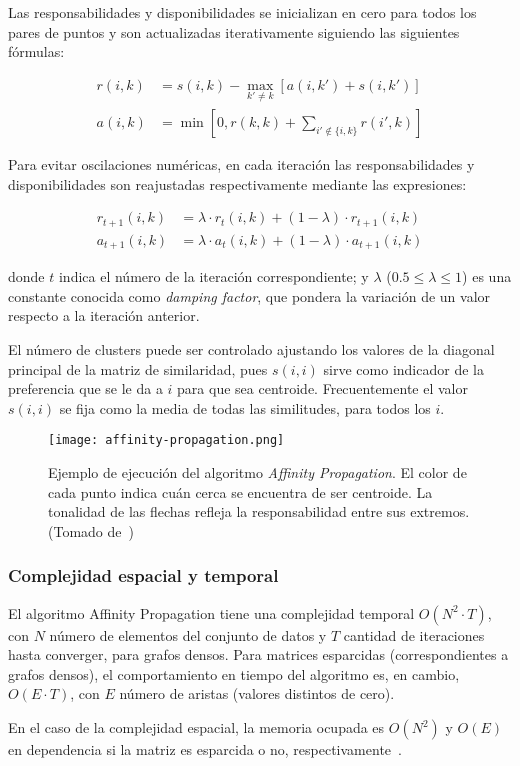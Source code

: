 Las responsabilidades y disponibilidades se inicializan en cero para todos los pares de puntos y son actualizadas iterativamente siguiendo las siguientes fórmulas:

\begin{align}
    \label{eq:responsibility}
    r(i,k) &= s(i,k) - \max_{k' \neq k}\left[ a(i, k') + s(i,k') \right] \\
    \label{eq:availability}
    a(i, k) &= \min\left[ 0, r(k,k) + \sum_{i'\notin \{i, k\}}{r(i', k)} \right]
\end{align}

Para evitar oscilaciones numéricas, en cada iteración las responsabilidades y disponibilidades son reajustadas respectivamente mediante las expresiones:

\begin{align}
    \label{eq:responsibility-damping}
    r_{t+1}(i,k) &= \lambda \cdot r_t (i,k) + (1-\lambda)\cdot r_{t+1}(i,k) \\
    \label{eq:availability-damping}
    a_{t+1}(i,k) &= \lambda \cdot a_t (i,k) + (1-\lambda)\cdot a_{t+1}(i,k)
\end{align}

\noindent
donde $t$ indica el número de la iteración correspondiente;
y $\lambda$ ($0.5 \leq \lambda \leq 1$) es una constante conocida como \textit{damping factor}, que pondera la variación de un valor respecto a la iteración anterior.

El número de clusters puede ser controlado ajustando los valores de la diagonal principal de la matriz de similaridad, pues $s(i,i)$ sirve como indicador de la preferencia que se le da a $i$ para que sea centroide.
Frecuentemente el valor $s(i,i)$ se fija como la media de todas las similitudes, para todos los $i$.

\begin{figure}[!h]
    \centering
    \texttt{[image: affinity-propagation.png]}
    \caption{Ejemplo de ejecución del algoritmo \textit{Affinity Propagation}. El color de cada punto indica cuán cerca se encuentra de ser centroide. La tonalidad de las flechas refleja la responsabilidad entre sus extremos. (Tomado de~\cite{Murphy12})}
    \label{img:affinity-propagation}
\end{figure}

\subsubsection{Complejidad espacial y temporal}

El algoritmo Affinity Propagation tiene una complejidad temporal $O(N^2 \cdot T)$, con $N$ número de elementos del conjunto de datos y $T$ cantidad de iteraciones hasta converger, para grafos densos.
Para matrices esparcidas (correspondientes a grafos densos), el comportamiento en tiempo del algoritmo es, en cambio, $O(E\cdot T)$, con $E$ número de aristas (valores distintos de cero).

En el caso de la complejidad espacial, la memoria ocupada es $O(N^2)$ y $O(E)$ en dependencia si la matriz es esparcida o no, respectivamente~\cite{Murphy12}.

